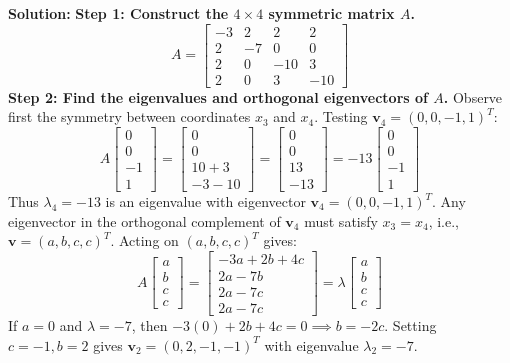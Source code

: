 \documentclass[11pt, letterpaper]{article}
\theoremstyle{definition}
\theoremstyle{remark}
\begin{document}
\textbf{Solution:}
\textbf{Step 1: Construct the $4 \times 4$ symmetric matrix $A$.}
\[
A = \begin{bmatrix} -3 & 2 & 2 & 2 \\ 2 & -7 & 0 & 0 \\ 2 & 0 & -10 & 3 \\ 2 & 0 & 3 & -10 \end{bmatrix}
\]
\textbf{Step 2: Find the eigenvalues and orthogonal eigenvectors of $A$.}
Observe first the symmetry between coordinates $x_3$ and $x_4$. Testing $\mathbf{v}_4 = (0, 0, -1, 1)^T$:
\[
A \begin{bmatrix} 0 \\ 0 \\ -1 \\ 1 \end{bmatrix} = \begin{bmatrix} 0 \\ 0 \\ 10 + 3 \\ -3 - 10 \end{bmatrix} = \begin{bmatrix} 0 \\ 0 \\ 13 \\ -13 \end{bmatrix} = -13 \begin{bmatrix} 0 \\ 0 \\ -1 \\ 1 \end{bmatrix}
\]
Thus $\lambda_4 = -13$ is an eigenvalue with eigenvector $\mathbf{v}_4 = (0, 0, -1, 1)^T$. Any eigenvector in the orthogonal complement of $\mathbf{v}_4$ must satisfy $x_3 = x_4$, i.e., $\mathbf{v} = (a, b, c, c)^T$. Acting on $(a, b, c, c)^T$ gives:
\[
A \begin{bmatrix} a \\ b \\ c \\ c \end{bmatrix} = \begin{bmatrix} -3a + 2b + 4c \\ 2a - 7b \\ 2a - 7c \\ 2a - 7c \end{bmatrix} = \lambda \begin{bmatrix} a \\ b \\ c \\ c \end{bmatrix}
\]
If $a = 0$ and $\lambda = -7$, then $-3(0) + 2b + 4c = 0 \implies b = -2c$. Setting $c = -1, b = 2$ gives $\mathbf{v}_2 = (0, 2, -1, -1)^T$ with eigenvalue $\lambda_2 = -7$.
\end{document}
